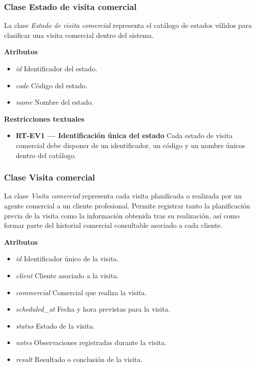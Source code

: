 \subsubsection{Clase Estado de visita comercial}

La clase \textit{Estado de visita comercial} representa el catálogo de estados válidos para clasificar una visita comercial dentro del sistema.

\textbf{Atributos}

\begin{itemize}
      \item \textit{id} Identificador del estado.
      \item \textit{code} Código del estado.
      \item \textit{name} Nombre del estado.
\end{itemize}

\textbf{Restricciones textuales}

\begin{itemize}
      \item \textbf{RT-EV1 — Identificación única del estado} Cada estado de visita comercial debe disponer de un identificador, un código y un nombre únicos dentro del catálogo.
\end{itemize}

\subsubsection{Clase Visita comercial}

La clase \textit{Visita comercial} representa cada visita planificada o realizada por un agente comercial a un cliente profesional. Permite registrar tanto la planificación previa de la visita como la información obtenida tras su realización, así como formar parte del historial comercial consultable asociado a cada cliente.

\textbf{Atributos}

\begin{itemize}
      \item \textit{id} Identificador único de la visita.
      \item \textit{client} Cliente asociado a la visita.
      \item \textit{commercial} Comercial que realiza la visita.
      \item \textit{scheduled\_at} Fecha y hora previstas para la visita.
      \item \textit{status} Estado de la visita.
      \item \textit{notes} Observaciones registradas durante la visita.
      \item \textit{result} Resultado o conclusión de la visita.
\end{itemize}

